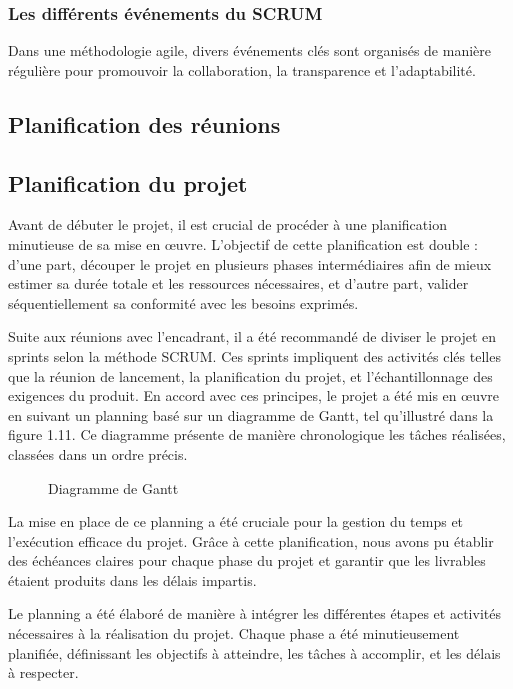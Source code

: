 \subsubsection{Les différents événements du SCRUM}
Dans une méthodologie agile, divers événements clés sont organisés de manière régulière pour promouvoir la collaboration, la transparence et l'adaptabilité. 

\subsection{Planification des réunions}


\subsection{Planification du projet}
Avant de débuter le projet, il est crucial de procéder à une planification minutieuse de sa mise en œuvre. L'objectif de cette planification est double : d'une part, découper le projet en plusieurs phases intermédiaires afin de mieux estimer sa durée totale et les ressources nécessaires, et d'autre part, valider séquentiellement sa conformité avec les besoins exprimés.

Suite aux réunions avec l'encadrant, il a été recommandé de diviser le projet en sprints selon la méthode SCRUM. Ces sprints impliquent des activités clés telles que la réunion de lancement, la planification du projet, et l'échantillonnage des exigences du produit. En accord avec ces principes, le projet a été mis en œuvre en suivant un planning basé sur un diagramme de Gantt, tel qu'illustré dans la figure 1.11. Ce diagramme présente de manière chronologique les tâches réalisées, classées dans un ordre précis.

\newpage
  \begin{figure}[H]
    \begin{center}
    \end{center}
    \caption{Diagramme de Gantt}
\end{figure}

La mise en place de ce planning a été cruciale pour la gestion du temps et l'exécution efficace du projet. Grâce à cette planification, nous avons pu établir des échéances claires pour chaque phase du projet et garantir que les livrables étaient produits dans les délais impartis. 



Le planning a été élaboré de manière à intégrer les différentes étapes et activités nécessaires à la réalisation du projet. Chaque phase a été minutieusement planifiée, définissant les objectifs à atteindre, les tâches à accomplir, et les délais à respecter.
    

